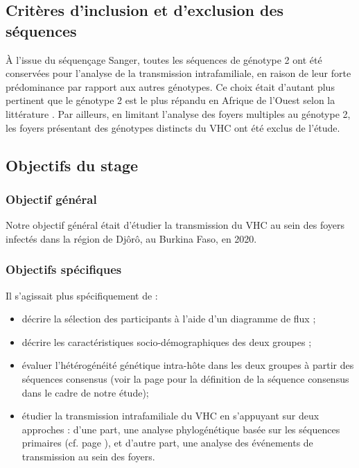 \documentclass[a4paper,12pt]{article}
\begin{document}
\subsection{Critères d'inclusion et d'exclusion des séquences}

À l’issue du séquençage Sanger, toutes les séquences de génotype 2 ont été conservées pour l’analyse de la transmission intrafamiliale, en raison de leur forte prédominance par rapport aux autres génotypes. Ce choix était d’autant plus pertinent que le génotype 2 est le plus répandu en Afrique de l’Ouest selon la littérature \cite{zebaCharacterisationHepatitisVirus2014}. Par ailleurs, en limitant l’analyse des foyers multiples au génotype 2, les foyers présentant des génotypes distincts du VHC ont été exclus de l’étude.


\subsection{Objectifs du stage}

\subsubsection{Objectif général }
Notre objectif général était d’étudier la transmission du VHC au sein des foyers infectés dans la région de Djôrô, au Burkina Faso, en 2020.
\subsubsection{Objectifs spécifiques }
Il s'agissait plus spécifiquement de :
\begin{itemize}
\item décrire la sélection des participants à l’aide d’un diagramme de flux ;
 \item décrire les caractéristiques socio-démographiques des deux groupes ;
 \item évaluer l’hétérogénéité génétique intra-hôte dans les deux groupes à partir des séquences consensus (voir la page \pageref{sec:analyse} pour la définition de la séquence consensus dans le cadre de notre étude);
  \item étudier la transmission intrafamiliale du VHC en s’appuyant sur deux approches : d’une part, une analyse phylogénétique basée sur les séquences primaires (cf. page \pageref{sec:analyse}), et d’autre part, une analyse des événements de transmission au sein des foyers.
\end{itemize}

\newpage 
\end{document}
